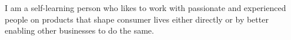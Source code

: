 
\begin{cvparagraph}

I am a self-learning person who likes to work with passionate and experienced people on products that shape consumer lives either directly or by better enabling other businesses to do the same.
\end{cvparagraph}


